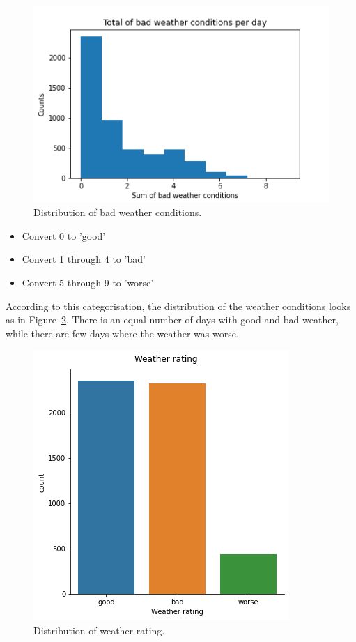 \documentclass{article}
\begin{document}
 \begin{figure}[h]
 \centering
\includegraphics[scale=0.5, valign=t]{../figures/fig_bad_weather_conditions.png}
\caption{Distribution of bad weather conditions.} \label{fig:weather}
\end{figure} 

\begin{itemize}
\item Convert 0 to 'good'
\item Convert 1 through 4 to 'bad'
\item Convert 5 through 9 to 'worse'
\end{itemize}

According to this categorisation, the distribution of the weather conditions looks as in Figure~\ref{fig:weather_rating}. There is an equal number of days with good and bad weather, while there are few days where the weather was worse.

 \begin{figure}[h]
 \centering
\includegraphics[scale=0.4, valign=t]{../figures/weather_rating.png}
\caption{Distribution of weather rating.} \label{fig:weather_rating}
\end{figure} 
  
\end{document}
